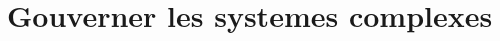 \documentclass[newPxFont]{beamer}
\begin{document}
%
%
%




\section{Gouverner les systemes complexes}
\end{document}
